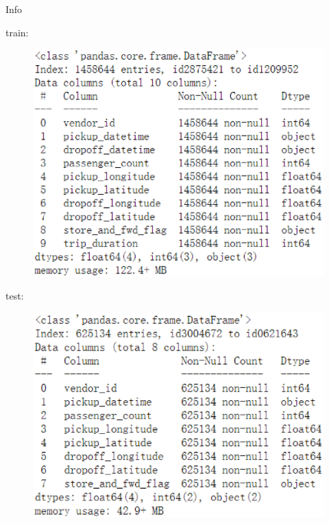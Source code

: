 \documentclass[
 size=14pt,
 paper=smartboard,  %
 mode=present, 		%
 display=slides, 	%
 style=tuliplab,  	%
 pauseslide,
 fleqn,leqno]{powerdot}
\begin{document}
\begin{slide}{Info}
\twocolumn
{
  train:
  \begin{figure}\includegraphics[scale=0.5]{figures/five.eps}\end{figure}
}
{
  test:
  \begin{figure}\includegraphics[scale=0.5]{figures/six.eps}\end{figure}
}
\end{slide}
\end{document}
